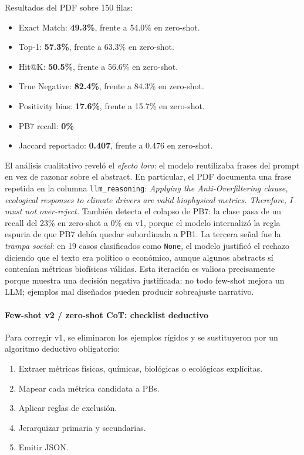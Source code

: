 Resultados del PDF sobre 150 filas:

\begin{itemize}
\item Exact Match: \textbf{49.3\%}, frente a 54.0\% en zero-shot.
\item Top-1: \textbf{57.3\%}, frente a 63.3\% en zero-shot.
\item Hit@K: \textbf{50.5\%}, frente a 56.6\% en zero-shot.
\item True Negative: \textbf{82.4\%}, frente a 84.3\% en zero-shot.
\item Positivity bias: \textbf{17.6\%}, frente a 15.7\% en zero-shot.
\item PB7 recall: \textbf{0\%}
\item Jaccard reportado: \textbf{0.407}, frente a 0.476 en zero-shot.
\end{itemize}

El análisis cualitativo reveló el \emph{efecto loro}: el modelo reutilizaba frases del prompt en vez de razonar sobre el abstract. En particular, el PDF documenta una frase repetida en la columna \texttt{llm\_reasoning}: \emph{Applying the Anti-Overfiltering clause, ecological responses to climate drivers are valid biophysical metrics. Therefore, I must not over-reject.} También detecta el colapso de PB7: la clase pasa de un recall del 23\% en zero-shot a 0\% en v1, porque el modelo internalizó la regla espuria de que PB7 debía quedar subordinada a PB1. La tercera señal fue la \emph{trampa social}: en 19 casos clasificados como \texttt{None}, el modelo justificó el rechazo diciendo que el texto era político o económico, aunque algunos abstracts sí contenían métricas biofísicas válidas. Esta iteración es valiosa precisamente porque muestra una decisión negativa justificada: no todo few-shot mejora un LLM; ejemplos mal diseñados pueden producir sobreajuste narrativo.

\paragraph*{Few-shot v2 / zero-shot CoT: checklist deductivo}

Para corregir v1, se eliminaron los ejemplos rígidos y se sustituyeron por un algoritmo deductivo obligatorio:

\begin{enumerate}
\item Extraer métricas físicas, químicas, biológicas o ecológicas explícitas.
\item Mapear cada métrica candidata a PBs.
\item Aplicar reglas de exclusión.
\item Jerarquizar primaria y secundarias.
\item Emitir JSON.
\end{enumerate}

